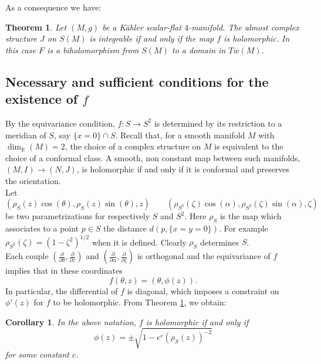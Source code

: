 \documentclass[11pt]{amsart}
\theoremstyle{definition}
\theoremstyle{plain}
\newtheorem{Teorema}[Def]{Theorem}
\theoremstyle{definition}
\theoremstyle{plain}
\theoremstyle{remark}
\theoremstyle{plain}
\newtheorem{Corollary}[Def]{Corollary}
\newcommand{\numberset}{\mathbb}
\newcommand{\R}{\numberset{R}}
\newcommand{\de}{\partial}
\begin{document}
As a consequence we have:
\begin{Teorema} \label{Th2.5}
Let $(M, g)$ be a K\"ahler scalar-flat  $4$-manifold. The almost complex structure $J$ on $S(M)$ is integrable if and only if the map $f$ is holomorphic. In this case $F$ is a biholomorphism from $S(M)$ to a domain in $Tw(M)$.
\end{Teorema}
   



\subsection{Necessary and sufficient conditions for the existence of $f$}

\smallskip

By the equivariance condition, $f:S \to S^2$ is determined by its restriction to a meridian of $S$, say $\{x=0\} \cap S $. Recall that, for a smooth manifold $M$ with $\dim_{\R}(M)=2$,  the choice of a complex structure on $M$ is equivalent to the choice of a conformal class. A smooth, non constant map between such manifolds, $(M,I)\to (N,J)$, is holomorphic if and only if  it is conformal and preserves the orientation. \\
Let
\[
(\rho_S(z)\cos(\theta), \rho_S(z)\sin(\theta), z)  \qquad 
(\rho_{S^2}(\zeta)\cos(\alpha), \rho_{S^2}(\zeta)\sin(\alpha), \zeta)
\]
be two parametrizations for respectively $S$ and $S^2$. Here $\rho_S$ is the map which associates to a point $p\in S$ the distance $d(p, \{x=y=0\})$. For example $\rho_{S^2}(\zeta)=(1-\zeta^2)^{1/2}$ when it is defined. Clearly $\rho_S$ determines $S$. \\
Each couple $(\frac{\de}{\de \theta}, \frac{\de}{\de z}) $ and $(\frac{\de}{\de \alpha}, \frac{\de}{\de \zeta}) $ is orthogonal and the equivariance of $f$ 
implies that in these coordinates
\[
f(\theta, z)=(\theta, \phi(z)).
\]
In particular, the differential of $f$ is diagonal, which imposes  a constraint on $\phi'(z)$ for 
$f$  to be holomorphic. From  Theorem \ref{Th2.5}, we obtain: \\

\begin{Corollary}
In the above notation, $f$ is holomorphic if and only if 
\[
\phi(z) = \pm\sqrt{1 -  e^c  ( \rho_S (z))^{- 2}}
\]
for some constant $c$.
\end{Corollary}
\end{document}
